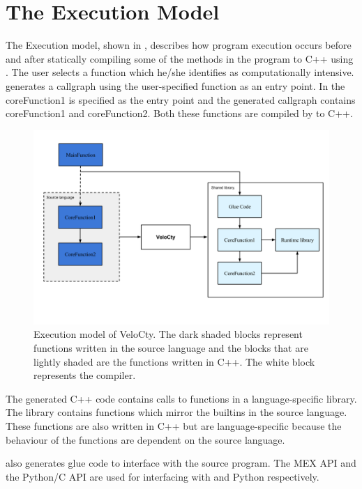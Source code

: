 \section{The Execution Model} 
\label{sec:execModel}
The Execution model, shown in , describes how program execution occurs before and after statically compiling some of the methods in the program to C++ using \velocty. The user selects a function which he/she identifies as computationally intensive. \velocty generates a callgraph using the user-specified function as an entry point. In  the coreFunction1 is specified as the entry point and the  generated callgraph contains coreFunction1 and coreFunction2. Both these functions are compiled by \velocty to C++.
\begin{figure}[htbp]
\begin{center}
\includegraphics[scale=0.4]{Figures/WorkingDetails.png}
\caption[Execution Model]{Execution model of VeloCty. The dark shaded blocks represent functions written in the source language and the blocks that are lightly shaded are the functions written in C++. The white block represents the \velocty compiler.}\label{Fig:working}
\end{center}
\end{figure}

The generated C++ code contains calls to functions in a language-specific library. The library contains functions which mirror the builtins in the source language. These functions are also written in C++ but are language-specific because the behaviour of the functions are dependent on the source language.

\velocty also generates glue code to interface with the source program. The MEX API and the Python/C\cite{pyc} API are used for interfacing with \matlab and Python respectively. 

